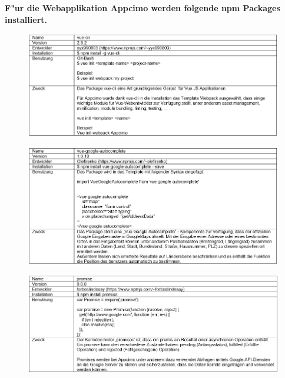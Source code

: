 \documentclass[a4paper, 11pt]{scrreprt}
\begin{document}
\textbf{F"ur die Webapplikation Appcimo werden folgende npm Packages installiert.} \\

\begin{figure} [H]
\begin{center}
\includegraphics[scale=0.7]{package2.png}
\label{vue-cli}
\end{center}
\end{figure}



\begin{figure} [H]
\begin{center}
\includegraphics[scale=0.7]{package1.png}
\label{autocomplete}
\end{center}
\end{figure}


\begin{figure} [H]
\begin{center}
\includegraphics[scale=0.7]{package3.png}
\label{promise}
\end{center}
\end{figure}
\end{document}
